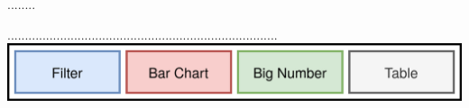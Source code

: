 \cleardoublepage\newpage\thispagestyle{empty}\null
\cleardoublepage\newpage\thispagestyle{empty}\null
\thispagestyle{empty}
\begin{center}
\Large{........}

\large{.............................................................................}
\includegraphics{images/dashboardsLayout.png}
\end{center}

\setlength{\abovedisplayskip}{-5pt}
\setlength{\abovedisplayshortskip}{-5pt}